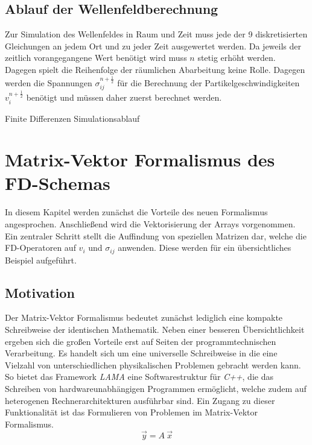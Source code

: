 \documentclass[pdftex,a4paper,parskip,listof=totoc,bibliography=totoc,onehalfspacing,12pt]{scrreprt}
\begin{document}
\section{Ablauf der Wellenfeldberechnung}
Zur Simulation des Wellenfeldes in Raum und Zeit muss jede der 9 diskretisierten Gleichungen an jedem Ort und zu jeder Zeit ausgewertet werden. Da jeweils der zeitlich vorangegangene Wert benötigt wird muss $n$ stetig erhöht werden. Dagegen spielt die Reihenfolge der räumlichen Abarbeitung keine Rolle. Dagegen werden die Spannungen $\sigma_{ij}^{n+\frac{1}{2}}$ für die Berechnung der Partikelgeschwindigkeiten $v_i^{n+\frac{1}{2}}$ benötigt und müssen daher zuerst berechnet werden.

\begin{algorithm}
\caption{Finite Differenzen Simulationsablauf}
\label{alg:FD}
\end{algorithm}

\cleardoublepage
\chapter{Matrix-Vektor Formalismus des FD-Schemas}
In diesem Kapitel werden zunächst die Vorteile des neuen Formalismus angesprochen. Anschließend wird die Vektorisierung der Arrays vorgenommen. Ein zentraler Schritt stellt die Auffindung von speziellen Matrizen dar, welche die FD-Operatoren auf $v_i$ und $\sigma_{ij}$ anwenden. Diese werden für ein übersichtliches Beispiel aufgeführt.
\section{Motivation}
Der Matrix-Vektor Formalismus bedeutet zunächst lediglich eine kompakte Schreibweise der identischen Mathematik. Neben einer besseren Übersichtlichkeit ergeben sich die großen Vorteile erst auf Seiten der programmtechnischen Verarbeitung. Es handelt sich um eine universelle Schreibweise in die eine Vielzahl von unterschiedlichen physikalischen Problemen gebracht werden kann. So bietet das Framework \textit{LAMA} \citep{lama:16} eine Softwarestruktur für \textit{C++}, die das Schreiben von hardwareunabhängigen Programmen ermöglicht, welche zudem auf heterogenen Rechnerarchitekturen ausführbar sind. Ein Zugang zu dieser Funktionalität ist das Formulieren von Problemen im Matrix-Vektor Formalismus.
\begin{equation}
	\vec{y} = A~\vec{x}
\end{equation}
\end{document}
